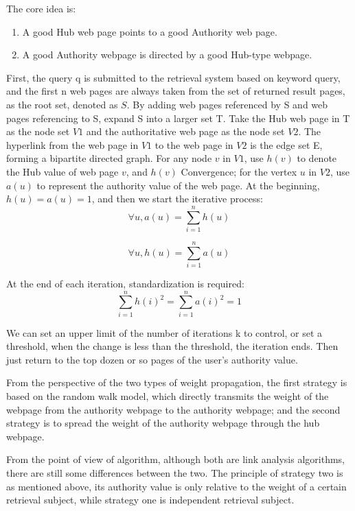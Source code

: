 \documentclass{article}
\begin{document}
The core idea is:
\begin{enumerate}
    \item A good Hub web page points to a good Authority web page.
    \item A good Authority webpage is directed by a good Hub-type webpage.
\end{enumerate}

First, the query q is submitted to the retrieval system based on keyword query, and the first n web pages are always taken from the set of returned result pages, as the root set, denoted as $S$.
By adding web pages referenced by S and web pages referencing to S, expand S into a larger set T. Take the Hub web page in T as the node set $V1$ and the authoritative web page as the node set $V2$.
The hyperlink from the web page in $V1$ to the web page in $V2$ is the edge set E, forming a bipartite directed graph. For any node $v$ in $V1$, use $h(v)$ to denote the Hub value of web page $v$, and $h (v)$ Convergence; for the vertex $u$ in $V2$, use $a (u)$ to represent the authority value of the web page.
At the beginning, $h(u) = a(u) = 1$, and then we start the iterative process:
\begin{equation}
    \forall u, a(u) = \sum^n_{i=1} h(u)
\end{equation}

\begin{equation}
    \forall u, h(u) = \sum^n_{i=1} a(u)
\end{equation}

At the end of each iteration, standardization is required:
\begin{equation}
    \sum^n_{i=1}h(i)^2 = \sum^n_{i=1}a(i)^2 = 1
\end{equation}

We can set an upper limit of the number of iterations k to control, or set a threshold, when the change is less than the threshold, the iteration ends. Then just return to the top dozen or so pages of the user’s authority value.

From the perspective of the two types of weight propagation, the first strategy is based on the random walk model, which directly transmits the weight of the webpage from the authority webpage to the authority webpage; and the second strategy is to spread the weight of the authority webpage through the hub webpage.

From the point of view of algorithm, although both are link analysis algorithms, there are still some differences between the two. The principle of strategy two is as mentioned above, its authority value is only relative to the weight of a certain retrieval subject, while strategy one is independent retrieval subject.
\end{document}
